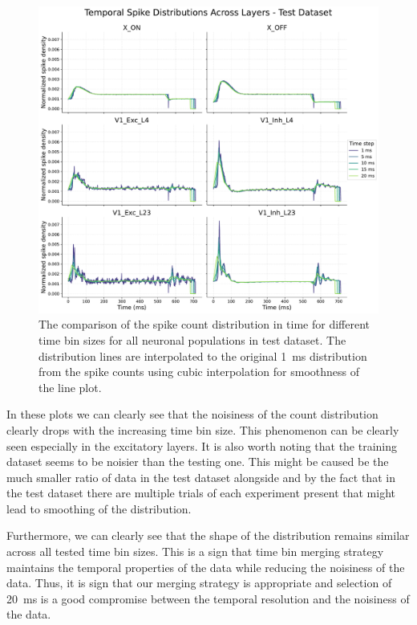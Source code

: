 \begin{figure}
    \centering
    \includegraphics[width=\linewidth]{img/plots/temporal_spike_distribution_test.pdf}
    \caption{The comparison of the spike count distribution in time for different time bin sizes for all neuronal populations in test dataset. The distribution lines are interpolated to the original 1~ms distribution from the spike counts using cubic interpolation for smoothness of the line plot.}
    \label{fig:temporal_spike_distribution_test}
\end{figure}

In these plots we can clearly see that the noisiness of the count distribution clearly drops with the increasing time bin size. This phenomenon can be clearly seen especially in the excitatory layers. It is also worth noting that the training dataset seems to be noisier than the testing one. This might be caused be the much smaller ratio of data in the test dataset alongside and by the fact that in the test dataset there are multiple trials of each experiment present that might lead to smoothing of the distribution.

Furthermore, we can clearly see that the shape of the distribution remains similar across all tested time bin sizes. This is a sign that time bin merging strategy maintains the temporal properties of the data while reducing the noisiness of the data. Thus, it is sign that our merging strategy is appropriate and selection of 20~ms is a good compromise between the temporal resolution and the noisiness of the data.

